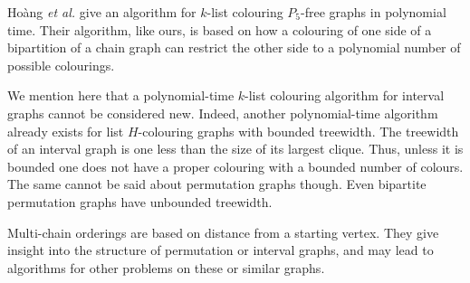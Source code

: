 \documentclass[12pt]{llncs}
\begin{document}
 Ho{\`{a}}ng \textit{et al.} \cite{hoangP5} give an algorithm for $k$-list colouring 
 $P_5$-free graphs in polynomial time. 
 Their algorithm, like ours, is based on how a colouring of one side of a bipartition of a chain graph
 can restrict the other side to a polynomial number of possible colourings.  
 




We mention here that a polynomial-time $k$-list colouring algorithm for
interval graphs cannot be considered
new. Indeed, another polynomial-time algorithm already exists for list
$H$-colouring graphs
with bounded treewidth. The treewidth of an interval graph is
one less than the size of its largest clique. Thus, unless it is
bounded one does not have a proper colouring with a bounded number of
colours. The same cannot be said about permutation graphs though. Even
bipartite permutation graphs have unbounded treewidth.


Multi-chain orderings are based on distance from a
starting vertex. They give insight into the structure of permutation
or interval graphs, and may lead to algorithms for other problems on
these or similar graphs.
\end{document}
